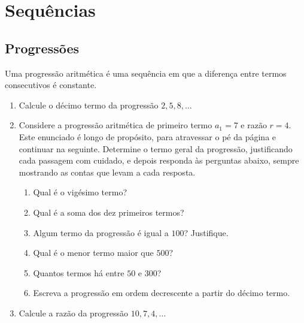 \documentclass[11pt,oneside]{book}
\begin{document}
\chapter{Sequências}
\section{Progressões}
Uma progressão aritmética é uma sequência em que a diferença entre termos consecutivos é
constante.

\blocoexercicios
\begin{enumerate}[label=\textbf{\arabic*.}]
\item Calcule o décimo termo da progressão $2, 5, 8, \ldots$
\vspace*{19.5cm}
\item Considere a progressão aritmética de primeiro termo $a_1 = 7$ e razão $r = 4$.
Este enunciado é longo de propósito, para atravessar o pé da página e continuar na seguinte.
Determine o termo geral da progressão, justificando cada passagem com cuidado, e depois
responda às perguntas abaixo, sempre mostrando as contas que levam a cada resposta.
  \begin{enumerate}
  \item Qual é o vigésimo termo?
  \item Qual é a soma dos dez primeiros termos?
  \item Algum termo da progressão é igual a $100$? Justifique.
  \item Qual é o menor termo maior que $500$?
  \item Quantos termos há entre $50$ e $300$?
  \item Escreva a progressão em ordem decrescente a partir do décimo termo.
  \end{enumerate}
\item Calcule a razão da progressão $10, 7, 4, \ldots$
\end{enumerate}
\end{document}
